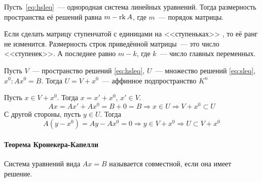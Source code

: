 \documentclass[12pt]{../../../notes}
\begin{document}
\begin{thrm}\label{thrm:dimsolnslq}
  Пусть~\eqref{eq:hsleq}~--- однородная система линейных уравнений. Тогда размерность
  пространства её решений равна $m - \operatorname{rk} A$, где $m$~--- порядок матрицы.
\end{thrm}
\begin{ittproof}
  Если сделать матрицу ступенчатой с единицами на <<ступеньках>> , то её ранг не изменится. 
  Размерность строк приведённой матрицы~--- это число <<ступенек>>. 
  А последнее равно $m-k$, где $k$~--- число главных переменных.
\end{ittproof}

\begin{thrm}\label{thrm:homtoordlinsys}
  Пусть $V$~--- пространство решений \eqref{eq:hsleq}, $U$~--- множество решений \eqref{eq:sleq},
  $x^0\colon Ax^0 = B$. Тогда $U =  V+ x^0$~--- аффинное подпространство $K^n$ 
\end{thrm}
\begin{ittproof}
  Пусть $x \in V + x^0$. Тогда $x = x'+ x^0$, $x' \in V$.
  \[
    A x = Ax' + Ax^0 = B + 0 = B \Rightarrow x\in U \Rightarrow V + x^0 \subset U
  \]
  С другой стороны, пусть $y \in U$. Тогда 
  \[
    A(y - x^0) = Ay - Ax^0 = 0 \Rightarrow y \in V+x^0 \Rightarrow U \subset V+ x^0 
  \]
\end{ittproof}

\paragraph{Теорема Кронекера-Капелли}

\begin{defn}\label{defn:compsysleq}
  Система уравнений вида $Ax=B$ называется совместной, если она имеет решение.
\end{defn}
\end{document}
